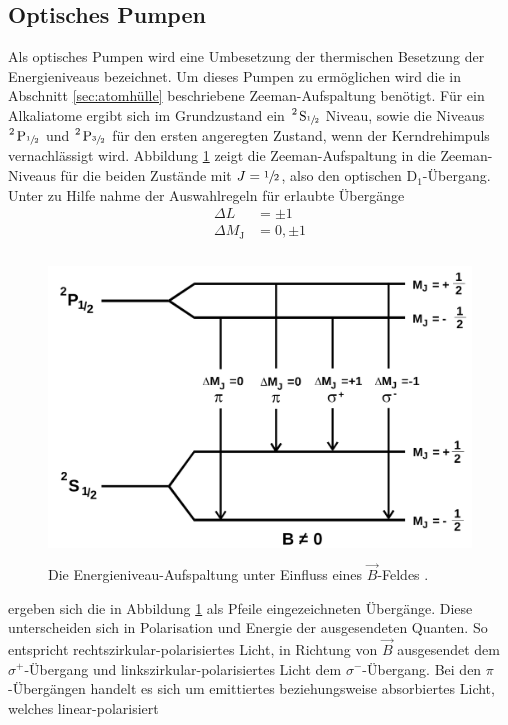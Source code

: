 \subsection{Optisches Pumpen}
\label{sec:pumpen}
Als optisches Pumpen wird eine Umbesetzung der thermischen Besetzung der Energieniveaus bezeichnet.
Um dieses Pumpen zu ermöglichen wird die in Abschnitt \ref{sec:atomhülle} beschriebene Zeeman-Aufspaltung benötigt.
Für ein Alkaliatome ergibt sich im Grundzustand ein $\ce{^2 S_{\sfrac{1}{2}}}$ Niveau, sowie die Niveaus
$\ce{^2 P_{\sfrac{1}{2}}}$ und $\ce{^2 P_{\sfrac{3}{2}}}$ für den ersten angeregten Zustand, wenn der
Kerndrehimpuls vernachlässigt wird. Abbildung \ref{fig:aufspaltung} zeigt die Zeeman-Aufspaltung in die Zeeman-Niveaus für
die beiden Zustände mit $J=\sfrac{1}{2}$, also den optischen $\text{D}_1$-Übergang. Unter zu Hilfe nahme der Auswahlregeln für erlaubte Übergänge
\begin{align*}
  \Delta L & = \pm 1 \\
  \Delta M_\text{J} & = 0, \pm 1
\end{align*}
\begin{figure}
  \centering
  \includegraphics[height=8cm]{content/pictures/Energieniveaus.png}
  \caption{Die Energieniveau-Aufspaltung unter Einfluss eines $\vec{B}$-Feldes \cite{anleitung}.}
  \label{fig:aufspaltung}
\end{figure}
ergeben sich die in Abbildung \ref{fig:aufspaltung} als Pfeile eingezeichneten Übergänge.
Diese unterscheiden sich in Polarisation und Energie der ausgesendeten Quanten. So entspricht 
rechtszirkular-polarisiertes Licht, in Richtung von $\vec{B}$ ausgesendet dem $\sigma^+$-Übergang und 
linkszirkular-polarisiertes Licht dem $\sigma^-$-Übergang. Bei den $\pi$-Übergängen 
handelt es sich um emittiertes beziehungsweise absorbiertes Licht, welches linear-polarisiert
